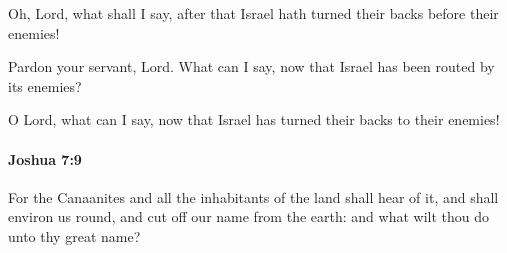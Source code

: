 			\begin{versebox}
					\item[BHS] 
					\item[ASV] Oh, Lord, what shall I say, after that Israel hath turned their backs before their enemies!
					\item[NIV] Pardon your servant, Lord. What can I say, now that Israel has been routed by its enemies?
					\item[NRSV] O Lord, what can I say, now that Israel has turned their backs to their enemies!
			\end{versebox}

		\paragraph{Joshua 7:9} %
			\label{JOSHUA-7-9}

			For the Canaanites and all the inhabitants of the land shall hear of it, and shall environ us round, and cut off our name from the earth: and what wilt thou do unto thy great name?

